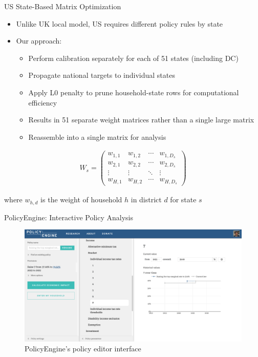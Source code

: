 \documentclass{beamer}
\begin{document}
\begin{frame}{US State-Based Matrix Optimization}
    \begin{itemize}
        \item Unlike UK local model, US requires different policy rules by state
        \item Our approach:
        \begin{itemize}
            \item Perform calibration separately for each of 51 states (including DC)
            \item Propagate national targets to individual states
            \item Apply L0 penalty to prune household-state rows for computational efficiency
            \item Results in 51 separate weight matrices rather than a single large matrix
            \item Reassemble into a single matrix for analysis
        \end{itemize}
    \end{itemize}
    
    \begin{align*}
    W_s = \begin{pmatrix}
    w_{1,1} & w_{1,2} & \cdots & w_{1,D_s} \\
    w_{2,1} & w_{2,2} & \cdots & w_{2,D_s} \\
    \vdots & \vdots & \ddots & \vdots \\
    w_{H,1} & w_{H,2} & \cdots & w_{H,D_s}
    \end{pmatrix}
    \end{align*}

    where $w_{h,d}$ is the weight of household $h$ in district $d$ for state $s$
\end{frame}

\begin{frame}{PolicyEngine: Interactive Policy Analysis}
    \begin{figure}
        \centering
        \includegraphics[width=\textwidth]{../../paper/figures/policyengine_policy.png}
        \caption{PolicyEngine's policy editor interface}
    \end{figure}
\end{frame}
\end{document}
